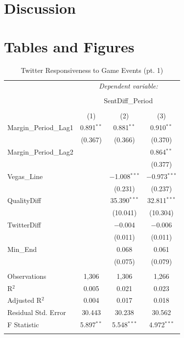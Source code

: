 \documentclass[12pt]{article}
\begin{document}
\begin{doublespacing}
\section{Discussion}

\section{Tables and Figures}

\begin{table}[H] 
\centering 
\caption{Twitter Responsiveness to Game Events (pt. 1)} 
\label{} 
\begin{tabular*}{\textwidth}{@{\extracolsep{\fill}}lccc} 
\hline 
\hline
 & \multicolumn{3}{c}{\textit{Dependent variable:}} \\ 
\cline{2-4} 
\\[-3.0ex] & \multicolumn{3}{c}{SentDiff\_Period} \\ 
\\[-1.5ex] & (1) & (2) & (3)\\ 
\hline
 Margin\_Period\_Lag1 & 0.891$^{**}$ & 0.881$^{**}$ & 0.910$^{**}$ \\ 
  & (0.367) & (0.366) & (0.370) \\ 
 Margin\_Period\_Lag2 &  &  & 0.864$^{**}$ \\ 
  &  &  & (0.377) \\ 
 Vegas\_Line &  & $-$1.008$^{***}$ & $-$0.973$^{***}$ \\ 
  &  & (0.231) & (0.237) \\ 
 QualityDiff &  & 35.390$^{***}$ & 32.811$^{***}$ \\ 
  &  & (10.041) & (10.304) \\ 
 TwitterDiff &  & $-$0.004 & $-$0.006 \\ 
  &  & (0.011) & (0.011) \\ 
 Min\_End &  & 0.068 & 0.061 \\ 
  &  & (0.075) & (0.079) \\ 
\hline \\[-1.8ex] 
Observations & 1,306 & 1,306 & 1,266 \\ 
R$^{2}$ & 0.005 & 0.021 & 0.023 \\ 
Adjusted R$^{2}$ & 0.004 & 0.017 & 0.018 \\ 
Residual Std. Error & 30.443 & 30.238 & 30.562 \\ 
F Statistic & 5.897$^{**}$ & 5.548$^{***}$ & 4.972$^{***}$ \\ 
\hline 
\hline \\[-1.8ex] 
\end{tabular*} 
\end{table} 


\end{doublespacing}
\end{document}

